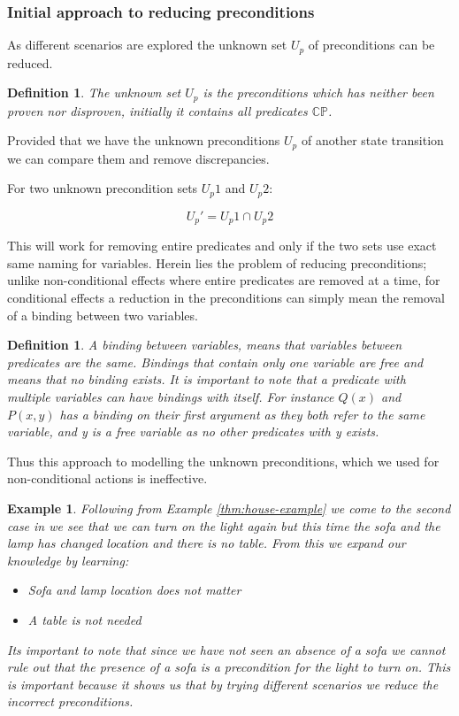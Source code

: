 \documentclass[../Master.tex]{subfiles}
\begin{document}
 
\subsubsection{Initial approach to reducing preconditions}
As different scenarios are explored the unknown set $U_p$ of preconditions can be reduced.
\newtheorem{thm-unknown-set}{Definition}
\begin{thm-unknown-set}
The unknown set $U_p$ is the preconditions which has neither been proven nor disproven, initially it contains all  predicates $\mathbb{CP}$.
\end{thm-unknown-set}
Provided that we have the unknown preconditions $U_p$ of another state transition we can compare them and remove discrepancies. 

For two unknown precondition sets $U_p1$ and $U_p2$:

\begin{equation}
\label{eq:unknownpredcondset}
	U_p' = U_p1 \cap U_p2
\end{equation}

This will work for removing entire predicates and only if the two sets use exact same naming for variables. Herein lies the problem of reducing preconditions; unlike non-conditional effects where entire predicates are removed at a time, for conditional effects a reduction in the preconditions can simply mean the removal of a binding between two variables. 
\newtheorem{thm-binding}{Definition}
\begin{thm-binding}
	A binding between variables, means that variables between predicates are the same. 
	Bindings that contain only one variable are free and means that no binding exists. 
	It is important to note that a predicate with multiple variables can have bindings with itself.
	For instance $Q(x)$ and $P(x,y)$ has a binding on their first argument as they both refer to the same variable, and y is a free variable as no other predicates with y exists.
\end{thm-binding} 
Thus this approach to modelling the unknown preconditions, which we used for non-conditional actions is ineffective. 

\newtheorem{thm-house-example-2}{Example}[section]
\begin{thm-house-example-2}\label{thm:house-example-2}
Following from Example \ref{thm:house-example} we come to the second case in 
we see that we can turn on the light again but this time the sofa and the lamp has changed location and
there is no table. From this we expand our knowledge by learning:
\begin{itemize}
	\item Sofa and lamp location does not matter
	\item A table is not needed
\end{itemize}
Its important to note that since we have not seen an absence of a sofa we cannot rule out that the presence of a sofa is a precondition for the light to turn on. This is important because it shows us that by trying different scenarios we reduce the incorrect preconditions.
\end{thm-house-example-2}
\end{document}
